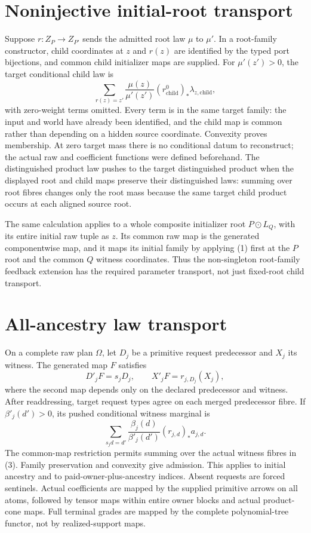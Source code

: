 \documentclass[11pt]{article}\usepackage{amsmath,amssymb,amsthm,geometry}\geometry{margin=1in}
\begin{document}
\section{Noninjective initial-root transport}
Suppose $r:Z_P\to Z_{P'}$ sends the admitted root law $\mu$ to $\mu'$. In a root-family constructor, child coordinates at $z$ and $r(z)$ are identified by the typed port bijections, and common child initializer maps are supplied. For $\mu'(z')>0$, the target conditional child law is
\[
 \sum_{r(z)=z'}\frac{\mu(z)}{\mu'(z')}
       (r^0_{\mathrm{child}})_*\lambda_{z,\mathrm{child}},        \tag{1}
\]
with zero-weight terms omitted. Every term is in the same target family: the input and world have already been identified, and the child map is common rather than depending on a hidden source coordinate. Convexity proves membership. At zero target mass there is no conditional datum to reconstruct; the actual raw and coefficient functions were defined beforehand. The distinguished product law pushes to the target distinguished product when the displayed root and child maps preserve their distinguished laws: summing over root fibres changes only the root mass because the same target child product occurs at each aligned source root.

The same calculation applies to a whole composite initializer root $P\odot L_Q$, with its entire initial raw tuple as $z$. Its common raw map is the generated componentwise map, and it maps its initial family by applying (1) first at the $P$ root and the common $Q$ witness coordinates. Thus the non-singleton root-family feedback extension has the required parameter transport, not just fixed-root child transport.

\section{All-ancestry law transport}
On a complete raw plan $\Omega$, let $D_j$ be a primitive request predecessor and $X_j$ its witness. The generated map $F$ satisfies
\[
 D'_jF=s_jD_j,\qquad X'_jF=r_{j,D_j}(X_j),             \tag{2}
\]
where the second map depends only on the declared predecessor and witness. After readdressing, target request types agree on each merged predecessor fibre. If $\beta'_j(d')>0$, its pushed conditional witness marginal is
\[
 \sum_{s_jd=d'}\frac{\beta_j(d)}{\beta'_j(d')}
                    (r_{j,d})_*a_{j,d}.               \tag{3}
\]
The common-map restriction permits summing over the actual witness fibres in (3). Family preservation and convexity give admission. This applies to initial ancestry and to paid-owner-plus-ancestry indices. Absent requests are forced sentinels. Actual coefficients are mapped by the supplied primitive arrows on all atoms, followed by tensor maps within entire owner blocks and actual product-cone maps. Full terminal grades are mapped by the complete polynomial-tree functor, not by realized-support maps.
\end{document}
